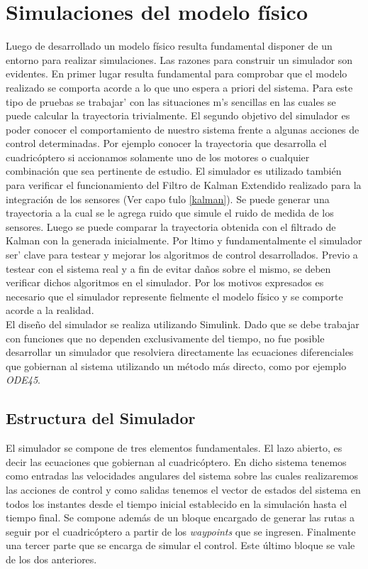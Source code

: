 \documentclass[main]{subfiles}
\begin{document}
\chapter{Simulaciones del modelo f\'isico}
\label{chap:simulador}

Luego de desarrollado un modelo f\'isico resulta fundamental disponer de un entorno para realizar simulaciones. Las razones para construir un simulador son evidentes. En primer lugar resulta fundamental para comprobar que el modelo realizado se comporta acorde a lo que uno espera a priori del sistema. Para este tipo de pruebas se trabajar\a' con las situaciones m\a's sencillas en las cuales se puede calcular la trayectoria trivialmente. El segundo objetivo del simulador es poder conocer el comportamiento de nuestro sistema frente a algunas acciones de control determinadas. Por ejemplo conocer la trayectoria que desarrolla el cuadric\'optero si accionamos solamente uno de los motores o cualquier combinaci\'on que sea pertinente de estudio. El simulador es utilizado tambi\'en para verificar el funcionamiento del Filtro de Kalman Extendido realizado para la integraci\'on de los sensores (Ver capo \'tulo \ref{kalman}). Se puede generar una trayectoria a la cual se le agrega ruido que simule el ruido de medida de los sensores. Luego se puede comparar la trayectoria obtenida con el filtrado de Kalman con la generada inicialmente. Por 	ltimo y fundamentalmente el simulador ser\a' clave para testear y mejorar los algoritmos de control desarrollados. Previo a testear con el sistema real y a fin de evitar da\~nos sobre el mismo, se deben verificar dichos algoritmos en el simulador. Por los motivos expresados es necesario que el simulador represente fielmente el modelo f\'isico y se comporte acorde a la realidad. \\

El dise\~no del simulador se realiza utilizando Simulink. Dado que se debe trabajar con funciones que no dependen exclusivamente del tiempo, no fue posible desarrollar un simulador que resolviera directamente las ecuaciones diferenciales que gobiernan al sistema utilizando un m\'etodo m\'as directo, como por ejemplo \emph{ODE45}. 



\section{Estructura del Simulador}

El simulador se compone de tres elementos fundamentales. El lazo abierto, es decir las ecuaciones que gobiernan al cuadric\'optero. En dicho sistema tenemos como entradas las velocidades angulares del sistema sobre las cuales realizaremos las acciones de control y como salidas tenemos el vector de estados del sistema en todos los instantes desde el tiempo inicial establecido en la simulaci\'on hasta el tiempo final. Se compone adem\'as de un bloque encargado de generar las rutas a seguir por el cuadric\'optero a partir de los \emph{waypoints} que se ingresen. Finalmente una tercer parte que se encarga de simular el control. Este \'ultimo bloque se vale de los dos anteriores.
\end{document}
